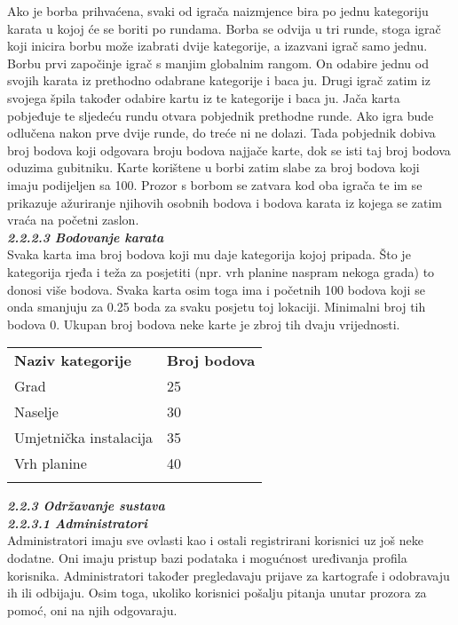 		Ako je borba prihvaćena, svaki od igrača naizmjence bira po jednu kategoriju karata u kojoj će se boriti po rundama. Borba se odvija u tri runde, stoga igrač koji inicira borbu može izabrati dvije kategorije, a izazvani igrač samo jednu. Borbu prvi započinje igrač s manjim globalnim rangom. On odabire jednu od svojih karata iz prethodno odabrane kategorije i baca ju. Drugi igrač zatim iz svojega špila također odabire kartu iz te kategorije i baca ju. Jača karta pobjeđuje te sljedeću rundu otvara pobjednik prethodne runde. Ako igra bude odlučena nakon prve dvije runde, do treće ni ne dolazi. Tada pobjednik dobiva broj bodova koji odgovara broju bodova najjače karte, dok se isti taj broj bodova oduzima gubitniku. Karte korištene u borbi zatim slabe za broj bodova koji imaju podijeljen sa 100. Prozor s borbom se zatvara kod oba igrača te im se prikazuje ažuriranje njihovih osobnih bodova i bodova karata iz kojega se zatim vraća na početni zaslon. \\
		
		
		\textbf{\textit{\small2.2.2.3 Bodovanje karata}}\\
		
		{Svaka karta ima broj bodova koji mu daje kategorija kojoj pripada. Što je kategorija rjeđa i teža za posjetiti (npr. vrh planine naspram nekoga grada) to donosi više bodova. Svaka karta osim toga ima i početnih 100 bodova koji se onda smanjuju za 0.25 boda za svaku posjetu toj lokaciji. Minimalni broj tih bodova 0. Ukupan broj bodova neke karte je zbroj tih dvaju vrijednosti.\\ }
		
		
		\begin{tabular}{ll}
			\textbf{Naziv kategorije} & \textbf{Broj bodova} \\
			Grad                      & 25                   \\
			Naselje                   & 30                   \\
			Umjetnička instalacija    & 35                   \\
			Vrh planine               & 40                   \\
				&                     
		\end{tabular}
	
		
		\textbf{\textit{2.2.3 Održavanje sustava}}\\
		 
		\textbf{\textit{\small2.2.3.1 Administratori}}\\
		
		{Administratori imaju sve ovlasti kao i ostali registrirani korisnici uz još neke dodatne. Oni imaju pristup bazi podataka i mogućnost uređivanja profila korisnika. Administratori također pregledavaju prijave za kartografe i odobravaju ih ili odbijaju. Osim toga, ukoliko korisnici pošalju pitanja unutar prozora za pomoć, oni na njih odgovaraju.} \\
		
